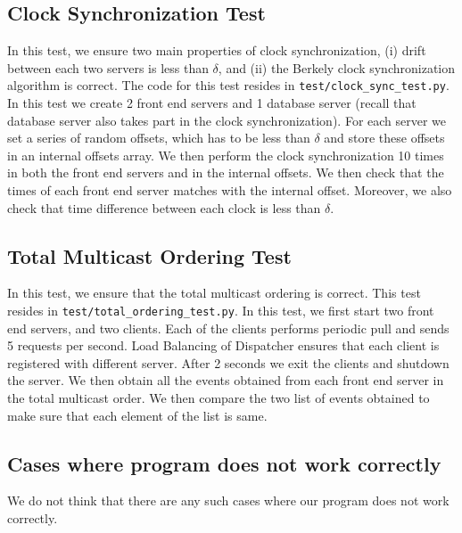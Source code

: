 \documentclass{article}
\begin{document}
\subsection{Clock Synchronization Test}
In this test, we ensure two main properties of clock synchronization, 
(i) drift between each two servers is less than $\delta$, and (ii) the 
Berkely clock synchronization algorithm is correct. The code for this test
resides in \texttt{test/clock_sync_test.py}. In this test we create 2 front
end servers and 1 database server (recall that database server also takes
part in the clock synchronization). For each server we set a series of random
offsets, which has to be less than $\delta$ and store these offsets 
in an internal offsets array. We then perform the clock synchronization
10 times in both the front end servers and in the internal offsets. 
We then check that the times of each front end server matches with the internal
offset. Moreover, we also check that time difference between each clock is
less than $\delta$.

\subsection{Total Multicast Ordering Test}
In this test, we ensure that the total multicast ordering is correct.
This test resides in \texttt{test/total\_ordering\_test.py}. In this test, we
first start two front end servers, and two clients. Each of the clients performs
periodic pull and sends 5 requests per second. Load Balancing of Dispatcher
ensures that each client is registered with different server. After 2 seconds
we exit the clients and shutdown the server. We then obtain all the events
obtained from each front end server in the total multicast order. We then
compare the two list of events obtained to make sure that each element of the 
list is same.


\subsection{Cases where program does not work correctly}
We do not think that there are any such cases where our program does not work
correctly.
\end{document}
